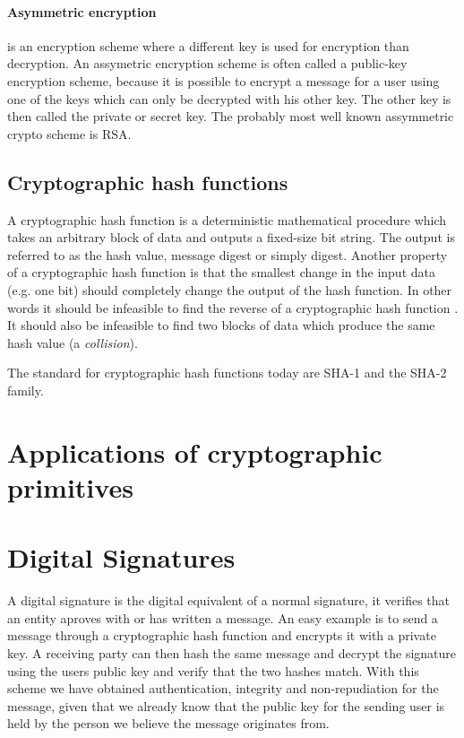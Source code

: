 \documentclass[english,12pt,a4paper]{book}
\begin{document}
\paragraph{Asymmetric encryption} is an encryption scheme where a different key
is used for encryption than decryption. An assymetric encryption scheme is
often called a public-key encryption scheme, because it is possible to encrypt
a message for a user using one of the keys which can only be decrypted with his
other key. The other key is then called the private or secret key. The probably
most well known assymmetric crypto scheme is \ac{RSA}.

\subsection{Cryptographic hash functions}
A cryptographic hash function is a deterministic mathematical procedure which
takes an arbitrary block of data and outputs a fixed-size bit string. The output
is referred to as the hash value, message digest or simply digest.
Another property of a cryptographic hash function is that the smallest change in
the input data (e.g. one bit) should completely change the output of the hash
function. In other words it should be infeasible to find the reverse of a
cryptographic hash function \cite[p. 335]{stallings}. It should also be infeasible to
find two blocks of data which produce the same hash value (a \emph{collision}).

The standard for cryptographic hash functions today are \ac{SHA}-1 and the
\ac{SHA}-2 family.

\section{Applications of cryptographic primitives}

\section{Digital Signatures}
A digital signature is the digital equivalent of a normal signature, it
verifies that an entity aproves with or has written a message. An easy example
is to send a message through a cryptographic hash function and encrypts it with
a private key. A receiving party can then hash the same message and decrypt the
signature using the users public key and verify that the two hashes match. With
this scheme we have obtained authentication, integrity and non-repudiation for
the message, given that we already know that the public key for the sending
user is held by the person we believe the message originates from.
\end{document}
